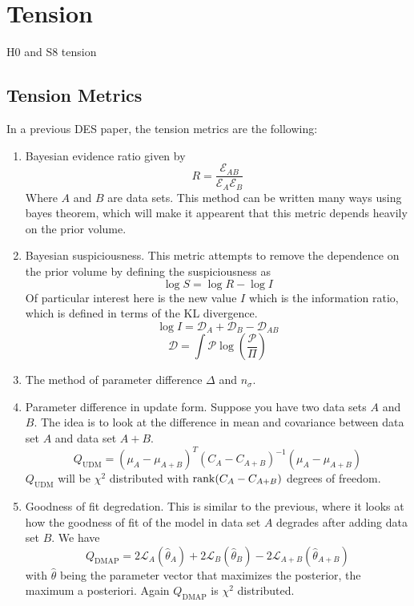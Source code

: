 \chapter{Tension}
H0 and S8 tension
\section{Tension Metrics}

In a previous DES paper, the tension metrics are the following:
\begin{enumerate}
    \item Bayesian evidence ratio given by
	\begin{equation}
		R = \frac{\mathcal{E}_{AB}}{\mathcal{E}_A\mathcal{E}_B}
	\end{equation}
	Where $A$ and $B$ are data sets. This method can be written many ways using bayes theorem, which will make it appearent that this metric depends heavily on the prior volume.
    \item Bayesian suspiciousness. This metric attempts to remove the dependence on the prior volume by defining the suspiciousness as 
	\begin{equation}
		\log S = \log R - \log I
	\end{equation}
	Of particular interest here is the new value $I$ which is the information ratio, which is defined in terms of the KL divergence.
	\begin{equation}
		\log I = \mathcal{D}_A + \mathcal{D}_B - \mathcal{D}_{AB}
	\end{equation}
	\begin{equation}
		\mathcal{D} = \int \mathcal{P} \log(\frac{\mathcal{P}}{\Pi})
	\end{equation}
    \item The method of parameter difference $\Delta$ and $n_\sigma$.
    \item Parameter difference in update form. Suppose you have two data sets $A$ and $B$. 
    The idea is to look at the difference in mean and covariance between data set $A$ and data set $A+B$.
	\begin{equation}
		Q_{\mathrm{UDM}} = {(\mu_A - \mu_{A+B})}^T{(C_A-C_{A+B})}^{-1}(\mu_A - \mu_{A+B})
	\end{equation}
	$Q_{\mathrm{UDM}}$ will be $\chi^2$ distributed with $\rank(C_A-C_{A+B})$ degrees of freedom.
    \item Goodness of fit degredation. This is similar to the previous, where it looks at how the goodness of fit of the model in data set $A$ degrades after adding data set $B$. We have
	\begin{equation}
		Q_{\mathrm{DMAP}} = 2\mathcal{L}_{A}(\hat{\theta}_A) + 2\mathcal{L}_B(\hat\theta_B) - 2 \mathcal{L}_{A+B}(\hat\theta_{A+B})
	\end{equation}
	with $\hat{\theta}$ being the parameter vector that maximizes the posterior, the maximum a posteriori. Again $Q_{\mathrm{DMAP}}$ is $\chi^2$ distributed. 
\end{enumerate}

